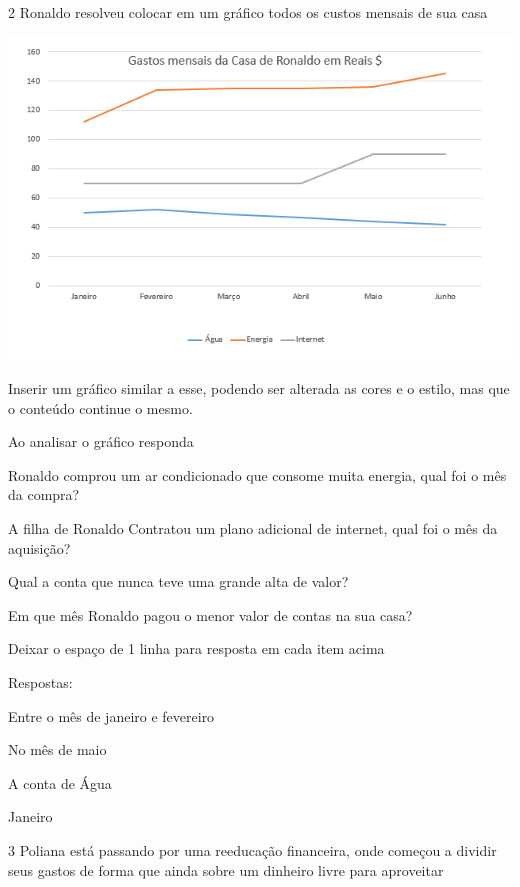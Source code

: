 \num{2} Ronaldo resolveu colocar em um gráfico todos os custos mensais de sua
casa

\includegraphics[width=5\times 30833in,height=3\times 41384in]{./imgSAEB_8_MAT/media/image40.png}

Inserir um gráfico similar a esse, podendo ser alterada as cores e o
estilo, mas que o conteúdo continue o mesmo.

Ao analisar o gráfico responda

\item Ronaldo comprou um ar condicionado que consome muita energia, qual
foi o mês da compra?

\item A filha de Ronaldo Contratou um plano adicional de internet, qual foi
o mês da aquisição?

\item Qual a conta que nunca teve uma grande alta de valor?
\item Em que mês Ronaldo pagou o menor valor de contas na sua casa?

Deixar o espaço de 1 linha para resposta em cada item acima

Respostas:

\item Entre o mês de janeiro e fevereiro
\item No mês de maio
\item A conta de Água
\item Janeiro

\num{3} Poliana está passando por uma reeducação financeira, onde começou a
dividir seus gastos de forma que ainda sobre um dinheiro livre para
aproveitar

